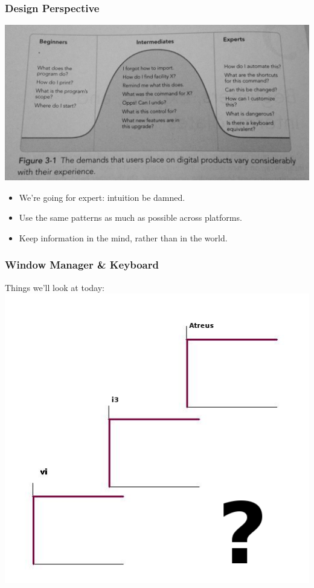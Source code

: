\documentclass{beamer}
\begin{document}
\begin{frame}
  \frametitle{Design Perspective}

  \includegraphics[scale=0.1]{images/about-face-diagram}

  \begin{itemize}
    \item We're going for expert: intuition be damned.
    \item Use the same patterns as much as possible across platforms.
    \item Keep information in the mind, rather than in the world.
  \end{itemize}
\end{frame}

\begin{frame}
  \frametitle{Window Manager \& Keyboard}
  Things we'll look at today:
  \includegraphics[scale=0.5]{images/ladder}
\end{frame}
\end{document}
